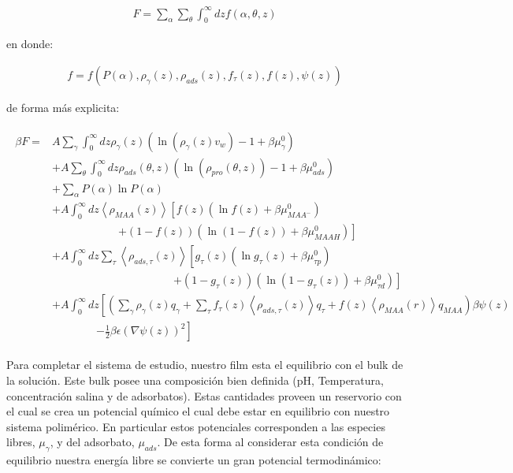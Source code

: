 \begin{align}
	F = \sum_\alpha \sum_\theta \int_0^\infty dz f(\alpha, \theta,z)
\end{align}

\noindent en donde:

\begin{align}
	 f=  f \left( P(\alpha), \rho_\gamma(z),\rho_{ads}(z), f_\tau(z), f(z), \psi(z)  \right)
	 \label{eq:film:funcionales}
 \end{align}

de forma m\'as explicita:

\begin{align}
	\begin{aligned}
		\beta F=  & A\sum_{\gamma}\int_0^\infty{dz\rho_\gamma(z)\left(\ln \left(\rho_\gamma (z)v_w\right) -1 + \beta\mu^0_\gamma\right)} \\
		&+ A\sum_{\theta}\int_0^\infty{dz\rho_{ads}(\theta,z)\left(\ln \left(\rho_{pro}(\theta,z)\right) -1 + \beta\mu^0_{ads} \right)} \\
		&+ \sum_\alpha{P(\alpha)\ln P(\alpha)} \\
		& + A\int_0^\infty dz \left<\rho_{MAA}(z)\right> \left[f(z)(\ln f(z)+ \beta\mu^0_{MAA^-})\right.\\
		& \qquad\qquad\qquad \left.+(1-f(z))(\ln (1-f(z))+\beta\mu^0_{MAAH})\right] \\
		& + A\int_0^\infty dz \sum_\tau \left<\rho_{ads,\tau}(z)\right> \left[g_\tau(z)(\ln g_\tau(z)+ \beta\mu^0_{\tau p})\right.\\
		&\qquad \qquad \qquad\qquad \qquad\quad \left.+(1-g_\tau(z))(\ln (1-g_\tau(z))+\beta\mu^0_{\tau d})\right]   \\
		 & +A\int_0^\infty dz \left[\left(\sum_{\gamma } {\rho_\gamma(z) q_\gamma + \sum_\tau{f_\tau(z) \left<\rho_{ads,\tau}(z)\right> q_\tau} +  f(z)\left<\rho_{MAA}(r)\right>q_{MAA}}\right)\beta\psi(z) \right. \\ & \qquad \qquad \left.-\frac{1}{2}\beta\epsilon(\nabla\psi(z))^2 \right]
		\end{aligned}
\end{align}


Para completar el sistema de estudio, nuestro film esta el equilibrio con el bulk de la soluci\'on. Este bulk  posee una composici\'on bien definida (pH, Temperatura, concentraci\'on salina y de adsorbatos). Estas cantidades proveen un reservorio con el cual se crea un potencial qu\'imico el cual debe estar en equilibrio con nuestro sistema polim\'erico. En particular estos potenciales corresponden a las especies libres, $\mu_\gamma$, y del adsorbato, $\mu_{ads}$.
De esta forma al considerar esta condici\'on de equilibrio nuestra energ\'ia libre se convierte un gran potencial termodin\'amico:

